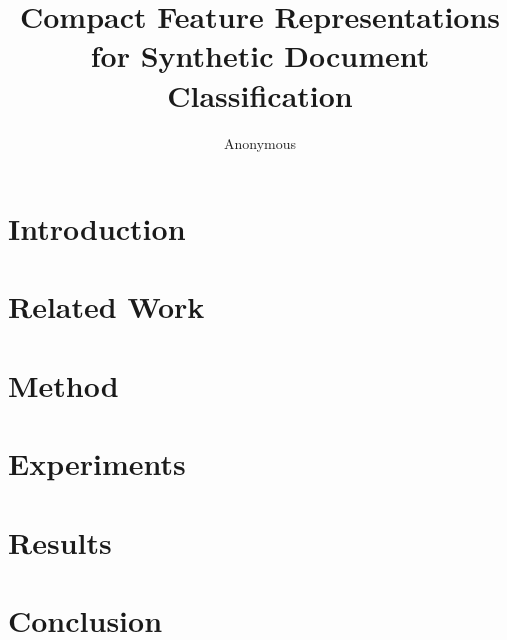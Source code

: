 \documentclass{article}
\title{Compact Feature Representations for Synthetic Document Classification}
\author{Anonymous}
\date{}
\begin{document}
\maketitle

\begin{abstract}
\end{abstract}

\section{Introduction}

\section{Related Work}

\section{Method}

\section{Experiments}

\section{Results}

\section{Conclusion}



\end{document}
